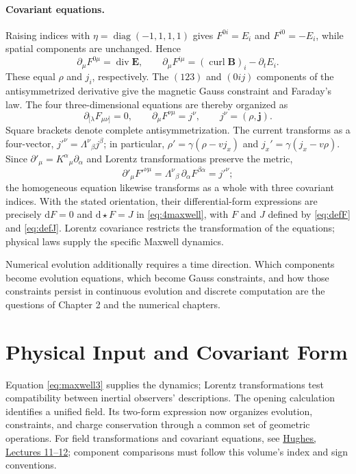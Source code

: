 \documentclass[11pt,openany]{book}
\numberwithin{equation}{chapter}
\theoremstyle{definition}
\theoremstyle{remark}
\newcommand{\dd}{\mathrm d}
\newcommand{\Div}{\operatorname{div}}
\newcommand{\curl}{\operatorname{curl}}
\begin{document}
\paragraph{Covariant equations.}
Raising indices with $\eta=\operatorname{diag}(-1,1,1,1)$ gives
$F^{0i}=E_i$ and $F^{i0}=-E_i$, while spatial components are unchanged. Hence
\[
\partial_\mu F^{0\mu}=\Div\bm E,\qquad
\partial_\mu F^{i\mu}=(\curl\bm B)_i-\partial_tE_i.
\]
These equal $\rho$ and $j_i$, respectively. The $(123)$ and $(0ij)$ components
of the antisymmetrized derivative give the magnetic Gauss constraint and Faraday's law.
The four three-dimensional equations are thereby organized as
\[
\partial_{[\lambda}F_{\mu\nu]}=0,\qquad
\partial_\mu F^{\nu\mu}=j^\nu,\qquad j^\nu=(\rho,\bm j).
\]
Square brackets denote complete antisymmetrization.
The current transforms as a four-vector, $j'^\nu=\Lambda^\nu{}_\beta j^\beta$;
in particular, $\rho'=\gamma(\rho-vj_x)$ and $j_x'=\gamma(j_x-v\rho)$.
Since $\partial'_\mu=K^\alpha{}_\mu\partial_\alpha$ and Lorentz transformations preserve the metric,
\[
\partial'_\mu F'^{\nu\mu}
=\Lambda^\nu{}_\beta\,\partial_\alpha F^{\beta\alpha}
=j'^\nu;
\]
the homogeneous equation likewise transforms as a whole with three covariant indices.
With the stated orientation, their differential-form expressions are precisely
$\dd F=0$ and $\dd\star F=J$ in \eqref{eq:4maxwell}, with $F$ and $J$ defined
by \eqref{eq:defF} and \eqref{eq:defJ}.
Lorentz covariance restricts the transformation of the equations; physical laws supply
the specific Maxwell dynamics.

Numerical evolution additionally requires a time direction. Which components become
evolution equations, which become Gauss constraints, and how those constraints persist
in continuous evolution and discrete computation are the questions of Chapter 2 and the numerical chapters.

\section{Physical Input and Covariant Form}
Equation \eqref{eq:maxwell3} supplies the dynamics; Lorentz transformations test compatibility
between inertial observers' descriptions. The opening calculation identifies a unified field.
Its two-form expression now organizes evolution, constraints, and charge conservation
through a common set of geometric operations.
For field transformations and covariant equations, see
\href{https://ocw.mit.edu/courses/8-033-introduction-to-relativity-and-spacetime-physics-fall-2024/mit8_033_f24_lec_full.pdf}{Hughes, Lectures 11--12};
component comparisons must follow this volume's index and sign conventions.
\end{document}
